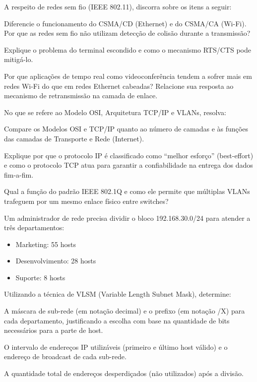 \documentclass[11pt, addpoints]{modelo/prova2}
\begin{document}
\question[1.5] A respeito de redes sem fio (IEEE 802.11), discorra sobre os itens a seguir:
\begin{choices}
    \item Diferencie o funcionamento do CSMA/CD (Ethernet) e do CSMA/CA (Wi-Fi). Por que as redes sem fio não utilizam detecção de colisão durante a transmissão?
    \item Explique o problema do terminal escondido e como o mecanismo RTS/CTS pode mitigá-lo.
    \item Por que aplicações de tempo real como videoconferência tendem a sofrer mais em redes Wi-Fi do que em redes Ethernet cabeadas? Relacione sua resposta ao mecanismo de retransmissão na camada de enlace. 
\end{choices}
\question[1.5] No que se refere ao Modelo OSI, Arquitetura TCP/IP e VLANs, resolva:
\begin{choices}
    \item Compare os Modelos OSI e TCP/IP quanto ao número de camadas e às funções das camadas de Transporte e Rede (Internet).
    \item Explique por que o protocolo IP é classificado como ``melhor esforço'' (best-effort) e como o protocolo TCP atua para garantir a confiabilidade na entrega dos dados fim-a-fim. 
    \item Qual a função do padrão IEEE 802.1Q e como ele permite que múltiplas VLANs trafeguem por um mesmo enlace físico entre switches?
\end{choices}
\newpage
\question[2.5] Um administrador de rede precisa dividir o bloco 192.168.30.0/24 para atender a três departamentos:
\begin{itemize}
    \item Marketing: 55 hosts
    \item Desenvolvimento: 28 hosts
    \item Suporte: 8 hosts
\end{itemize}
Utilizando a técnica de VLSM (Variable Length Subnet Mask), determine:
\begin{choices}
    \item A máscara de sub-rede (em notação decimal) e o prefixo (em notação /X) para cada departamento, justificando a escolha com base na quantidade de bits necessários para a parte de host.
    \item O intervalo de endereços IP utilizáveis (primeiro e último host válido) e o endereço de broadcast de cada sub-rede. 
    \item A quantidade total de endereços desperdiçados (não utilizados) após a divisão.
\end{choices}
\end{document}
